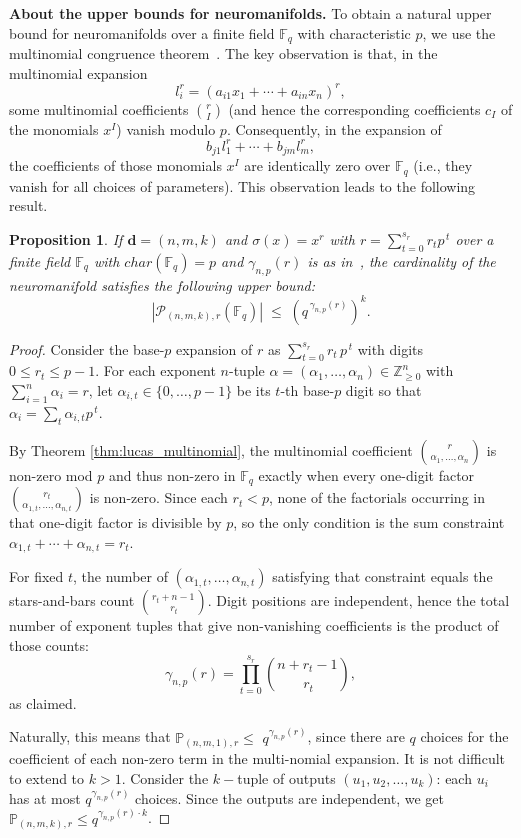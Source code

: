 \documentclass[a4paper]{cas-sc}
\newcommand{\dd}{\mathbf{d}}    %
\newcommand{\F}{\mathbb{F}}
\renewcommand{\P}{\mathbb{P}}
\newtheorem{proposition}[theorem]{Proposition}
\begin{document}
\noindent
\textbf{About the upper bounds for neuromanifolds.} To obtain a natural upper bound for neuromanifolds over a finite field $\F_q$ with characteristic $p$, we use the multinomial congruence theorem~\citep{CONRAD1995}. The key observation is that, in the multinomial expansion
\[
    l_i^r=(a_{i1}x_1+\cdots+a_{in}x_n)^r,
\]
some multinomial coefficients $\binom{r}{I}$ (and hence the corresponding coefficients $c_I$ of the monomials $x^I$) vanish modulo $p$. Consequently, in the expansion of
\[
    b_{j1}l_1^r+\cdots+b_{jm}l_m^r,
\]
the coefficients of those monomials $x^I$ are identically zero over $\F_q$ (i.e., they vanish for all choices of parameters). This observation leads to the following result.   
\begin{proposition}
\label{lem:global_count_k=1}
    If $\dd=(n,m,k)$ and $\sigma(x) = x^r$ with $r=\sum_{t=0}^{s_r} r_t p^{\,t}$ over a finite field $\F_q$ with $char(\F_q) = p$ and $\gamma_{n,p}(r)$ is as in~, the cardinality of the neuromanifold satisfies the following upper bound:
    \[
        |\mathcal P_{(n,m,k),r}(\F_q)|
        \;\le\;
        \left(q^{\,\gamma_{n,p}(r)}\right)^k.
    \]
\end{proposition}
\begin{proof}
    Consider the base-$p$ expansion of $r$ as $\sum_{t=0}^{s_r} r_t\,p^{\,t}$ with digits $0\le r_t\le p-1$. For each exponent $n$-tuple $\alpha=(\alpha_1,\dots ,\alpha_n) \in \mathbb{Z}_{\geq 0}^n$ with $\sum_{i=1}^n \alpha_i=r$, let $\alpha_{i,t}\in\{0,\dots ,p-1\}$ be its
    $t$-th base-$p$ digit so that $\alpha_i=\sum_t\alpha_{i,t} p^{\,t}$. 
    
    By Theorem \ref{thm:lucas_multinomial}, the multinomial coefficient $\binom{r}{\alpha_1,\dots ,\alpha_n}$ is non-zero
    mod $p$ and thus non-zero in $\F_q$ exactly when every one-digit factor
    $\binom{r_t}{\alpha_{1,t},\dots ,\alpha_{n,t}}$ is non-zero.
    Since each $r_t<p$, none of the factorials occurring in that
    one-digit factor is divisible by $p$, so the only condition is the sum constraint $\alpha_{1,t}+\cdots+\alpha_{n,t}=r_t$.

    For fixed $t$, the number of $(\alpha_{1,t},\dots,\alpha_{n,t})$ satisfying that constraint equals the stars-and-bars count $\binom{r_t+n-1}{\,r_t}$. Digit positions are independent, hence the total number of exponent tuples that give non-vanishing coefficients is the product of those counts:
    \[
        \gamma_{n,p}(r)=
        \prod_{t=0}^{s_r}
        \binom{n+r_t-1}{\,r_t},
    \]
    as claimed. 
    
    Naturally, this means that $\P_{(n,m,1), r} \le$ $q^{\gamma_{n,p}(r)}$, since there are $q$ choices for the coefficient of each non-zero term in the multi-nomial expansion. It is not difficult to extend to $k>1$. Consider the $k-$tuple of outputs $(u_1,u_2, \dots, u_k)$: each $u_i$ has at most $q^{\gamma_{n,p}(r)}$ choices. Since the outputs are independent, we get $\P_{(n,m,k), r} \le q^{\gamma_{n,p}(r) \cdot k}$.
\end{proof}
\end{document}
